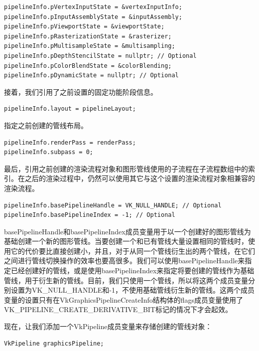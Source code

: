 \documentclass{ctexart}
\begin{document}
\begin{lstlisting}[language={[ANSI]C}]
pipelineInfo.pVertexInputState = &vertexInputInfo;
pipelineInfo.pInputAssemblyState = &inputAssembly;
pipelineInfo.pViewportState = &viewportState;
pipelineInfo.pRasterizationState = &rasterizer;
pipelineInfo.pMultisampleState = &multisampling;
pipelineInfo.pDepthStencilState = nullptr; // Optional
pipelineInfo.pColorBlendState = &colorBlending;
pipelineInfo.pDynamicState = nullptr; // Optional
\end{lstlisting}

接着，我们引用了之前设置的固定功能阶段信息。

\begin{lstlisting}[language={[ANSI]C}]
pipelineInfo.layout = pipelineLayout;
\end{lstlisting}

指定之前创建的管线布局。

\begin{lstlisting}[language={[ANSI]C}]
pipelineInfo.renderPass = renderPass;
pipelineInfo.subpass = 0;
\end{lstlisting}

最后，引用之前创建的渲染流程对象和图形管线使用的子流程在子流程数组中的索引。在之后的渲染过程中，仍然可以使用其它与这个设置的渲染流程对象相兼容的渲染流程。

\begin{lstlisting}[language={[ANSI]C}]
pipelineInfo.basePipelineHandle = VK_NULL_HANDLE; // Optional
pipelineInfo.basePipelineIndex = -1; // Optional
\end{lstlisting}

basePipelineHandle和basePipelineIndex成员变量用于以一个创建好的图形管线为基础创建一个新的图形管线。当要创建一个和已有管线大量设置相同的管线时，使用它的代价要比直接创建小，并且，对于从同一个管线衍生出的两个管线，在它们之间进行管线切换操作的效率也要高很多。我们可以使用basePipelineHandle来指定已经创建好的管线，或是使用basePipelineIndex来指定将要创建的管线作为基础管线，用于衍生新的管线。目前，我们只使用一个管线，所以将这两个成员变量分别设置为VK\_NULL\_HANDLE和-1，不使用基础管线衍生新的管线。这两个成员变量的设置只有在VkGraphicsPipelineCreateInfo结构体的flags成员变量使用了VK\_PIPELINE\_CREATE\_DERIVATIVE\_BIT标记的情况下才会起效。

现在，让我们添加一个VkPipeline成员变量来存储创建的管线对象：

\begin{lstlisting}[language={[ANSI]C}]
VkPipeline graphicsPipeline;
\end{lstlisting}
\end{document}
